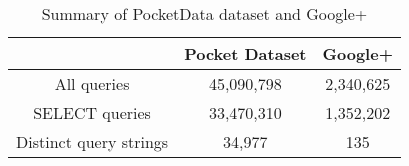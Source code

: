 \begin{table}
\begin{center}
\begin{tabular}{c c c}
	\toprule
	& Pocket Dataset & Google+\\
	\midrule
	All queries & 45,090,798 & 2,340,625\\

	SELECT queries & 33,470,310 & 1,352,202\\
	
	Distinct query strings & 34,977 & 135\\
	\bottomrule
\end{tabular}
\end{center}
\vspace{-3mm}
\caption{Summary of PocketData dataset and Google+} 
\label{tab:google_plus} 
\end{table}

